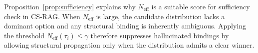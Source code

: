 \documentclass{article}
\theoremstyle{plain}
\theoremstyle{definition}
\theoremstyle{remark}
\begin{document}
Proposition~\ref{prop:sufficiency} explains why $N_{\mathrm{eff}}$ is a suitable score for sufficiency check in CS-RAG.
When $N_{\mathrm{eff}}$ is large, the candidate distribution lacks a dominant option and any structural binding is inherently ambiguous.
Applying the threshold $N_{\mathrm{eff}}(\tau_i)\le\gamma$ therefore suppresses hallucinated bindings by allowing structural propagation only when the distribution admits a clear winner.






\end{document}
